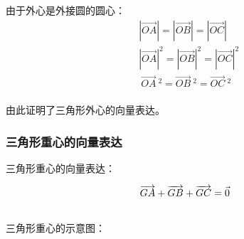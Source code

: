 \documentclass[UTF8]{ctexart}
\let\nvec\vec
\def\vec#1{\nvec{\vphantom b\smash{#1}}}
\begin{document}
    由于外心是外接圆的圆心：\vspace{5pt}
    \setcounter{equation}{0}
    \begin{align}
        &\left|\overrightarrow{OA}\right|=\left|\overrightarrow{OB}\right|=\left|\overrightarrow{OC}\right|\\[4mm]
        &\left|\overrightarrow{OA}\right|^2=\left|\overrightarrow{OB}\right|^2=\left|\overrightarrow{OC}\right|^2\\[4mm]
        &~\overrightarrow{OA}~^2=\overrightarrow{OB}~^2=\overrightarrow{OC}~^2
    \end{align}\\
    由此证明了三角形外心的向量表达。

\newpage
    
\subsubsection{三角形重心的向量表达}
    \setcounter{equation}{0}
    三角形重心的向量表达：
    \begin{large}
        \begin{equation*}
            \overrightarrow{GA}+\overrightarrow{GB}+\overrightarrow{GC}=\vec{0}
        \end{equation*}
    \end{large}\\   
    三角形重心的示意图： 
\end{document}

